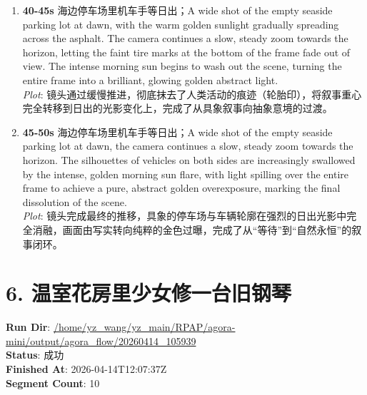 \documentclass[11pt,a4paper]{article}
\begin{document}
\begin{enumerate}
\item \textbf{40-45s} 海边停车场里机车手等日出；A wide shot of the empty seaside parking lot at dawn, with the warm golden sunlight gradually spreading across the asphalt. The camera continues a slow, steady zoom towards the horizon, letting the faint tire marks at the bottom of the frame fade out of view. The intense morning sun begins to wash out the scene, turning the entire frame into a brilliant, glowing golden abstract light.\\\newline \textit{Plot}: 镜头通过缓慢推进，彻底抹去了人类活动的痕迹（轮胎印），将叙事重心完全转移到日出的光影变化上，完成了从具象叙事向抽象意境的过渡。
\item \textbf{45-50s} 海边停车场里机车手等日出；A wide shot of the empty seaside parking lot at dawn, the camera continues a slow, steady zoom towards the horizon. The silhouettes of vehicles on both sides are increasingly swallowed by the intense, golden morning sun flare, with light spilling over the entire frame to achieve a pure, abstract golden overexposure, marking the final dissolution of the scene.\\\newline \textit{Plot}: 镜头完成最终的推移，具象的停车场与车辆轮廓在强烈的日出光影中完全消融，画面由写实转向纯粹的金色过曝，完成了从“等待”到“自然永恒”的叙事闭环。
\end{enumerate}

\section{6. 温室花房里少女修一台旧钢琴}
\textbf{Run Dir}: \url{/home/yz\_wang/yz\_main/RPAP/agora-mini/output/agora\_flow/20260414\_105939}\\
\textbf{Status}: 成功\\
\textbf{Finished At}: 2026-04-14T12:07:37Z\\
\textbf{Segment Count}: 10
\end{document}
